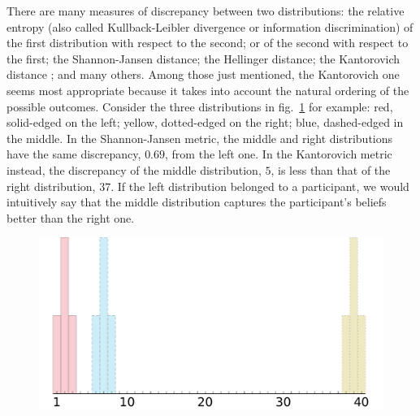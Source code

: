 \documentclass[\ifafour a4paper,12pt,\else a5paper,10pt,\fi%
onecolumn,oneside,article,%
british%
]{memoir}
\theoremstyle{remark}
\theoremstyle{innote}
\newcommand*{\citep}{\parencites}
\renewcommand*{\|}{\mathpunct{|}}
\newcommand*{\fig}{fig.}%
\begin{document}
There are many measures of discrepancy between two distributions: the
relative entropy (also called Kullback-Leibler divergence or information
discrimination) of the first distribution with respect to the second; or of
the second with respect to the first; the Shannon-Jansen distance; the
Hellinger distance; the Kantorovich distance
\citep{kantorovich1939_r1960,vasershtejn1969,dobrushin1970,vallender1972};
and many others. Among those just mentioned, the Kantorovich one seems most
appropriate because it takes into account the natural ordering of the
possible outcomes. Consider the three distributions in
\fig~\ref{fig:whykantorovich} for example: red, solid-edged on the left;
yellow, dotted-edged on the right; blue, dashed-edged in the middle. In the
Shannon-Jansen metric, the middle and right distributions have the same
discrepancy, $0.69$, from the left one. In the Kantorovich metric instead,
the discrepancy of the middle distribution, $5$, is less than that of the
right distribution, $37$. If the left distribution belonged to a
participant, we would intuitively say that the middle distribution captures
the participant's beliefs better than the right one.
\begin{figure}[b!]
\centering\includegraphics[width=0.75\linewidth]{whykantorovich.pdf}
\caption{}\label{fig:whykantorovich}
\end{figure}%
\end{document}
